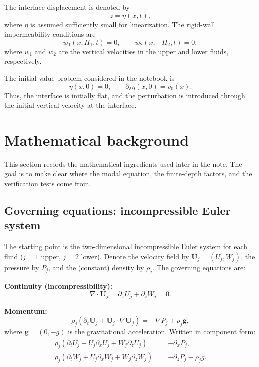 \documentclass[11pt,a4paper]{article}
\begin{document}
The interface displacement is denoted by
\begin{equation}
    z = \eta(x,t),
\end{equation}
where $\eta$ is assumed sufficiently small for linearization.  The rigid-wall impermeability conditions are
\begin{equation}
    w_1(x,H_1,t)=0, \qquad w_2(x,-H_2,t)=0,
\end{equation}
where $w_1$ and $w_2$ are the vertical velocities in the upper and lower fluids, respectively.

The initial-value problem considered in the notebook is
\begin{equation}
    \eta(x,0)=0,
    \qquad
    \partial_t \eta(x,0)=v_0(x).
    \label{eq:initial_conditions}
\end{equation}
Thus, the interface is initially flat, and the perturbation is introduced through the initial vertical velocity at the interface.

\section{Mathematical background}

This section records the mathematical ingredients used later in the note.  The goal is to make clear where the modal equation, the finite-depth factors, and the verification tests come from.

\subsection{Governing equations: incompressible Euler system}

The starting point is the two-dimensional incompressible Euler system for each fluid ($j=1$ upper, $j=2$ lower).  Denote the velocity field by $\bm{U}_j=(U_j,W_j)$, the pressure by $P_j$, and the (constant) density by $\rho_j$.  The governing equations are:

\medskip\noindent
\textbf{Continuity (incompressibility):}
\begin{equation}
    \nabla\cdot\bm{U}_j
    =
    \partial_x U_j + \partial_z W_j
    =
    0.
    \label{eq:euler_continuity}
\end{equation}

\textbf{Momentum:}
\begin{equation}
    \rho_j\left(\partial_t \bm{U}_j + \bm{U}_j\cdot\nabla\bm{U}_j\right)
    =
    -\nabla P_j + \rho_j \bm{g},
    \label{eq:euler_momentum}
\end{equation}
where $\bm{g}=(0,-g)$ is the gravitational acceleration.  Written in component form:
\begin{align}
    \rho_j\left(\partial_t U_j + U_j\partial_x U_j + W_j\partial_z U_j\right)
    &= -\partial_x P_j,
    \label{eq:euler_x_momentum}\\
    \rho_j\left(\partial_t W_j + U_j\partial_x W_j + W_j\partial_z W_j\right)
    &= -\partial_z P_j - \rho_j g.
    \label{eq:euler_z_momentum}
\end{align}
\end{document}
